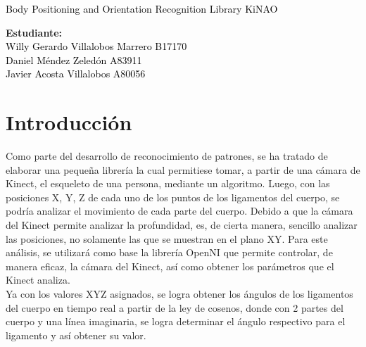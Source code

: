\documentclass[letterpaper]{article}
\newcommand{\uic}{black} %
\newcommand{\uim}{} %
\newcommand{\userinput}[1]{\textcolor{\uic}{\uim#1\uim}}
\begin{document}
\vspace*{2cm}

\begin{center}
\Huge
\userinput{Body Positioning and Orientation Recognition Library KiNAO}
\vspace*{1cm}
\end{center}

\noindent
\small\baselineskip=14pt
\textbf{Estudiante:}\\
\userinput{Willy Gerardo Villalobos Marrero B17170}\\
\userinput{Daniel Méndez Zeledón            A83911}\\
\userinput{Javier Acosta Villalobos         A80056}\\


\tableofcontents
{}
\pagebreak
\section{Introducción}

Como parte del desarrollo de reconocimiento de patrones, se ha tratado de elaborar una pequeña librería la cual permitiese tomar, a partir de una cámara de Kinect, el esqueleto de una persona, mediante un algoritmo. Luego, con las posiciones X, Y, Z de cada uno de los puntos de los ligamentos del cuerpo, se podría analizar el movimiento de cada parte del cuerpo. Debido a que la cámara del Kinect permite analizar la profundidad, es, de cierta manera, sencillo analizar las posiciones, no solamente las que se muestran en el plano XY. Para este análisis, se utilizará como base la librería OpenNI que permite controlar, de manera eficaz, la cámara del Kinect, así como obtener los parámetros que el Kinect analiza.\\

Ya con los valores XYZ asignados, se logra obtener los ángulos de los ligamentos del cuerpo en tiempo real a partir de la ley de cosenos, donde con 2 partes del cuerpo y una línea imaginaria, se logra determinar el ángulo respectivo para el ligamento y así obtener su valor.\\
\end{document}
